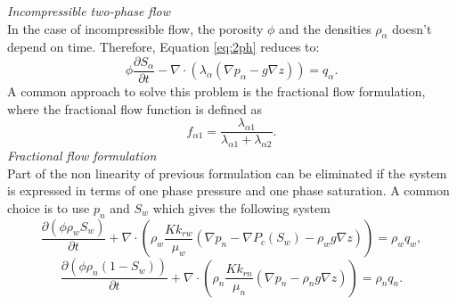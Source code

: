 \documentclass[12pt]{article}
\begin{document}
% 

\emph{Incompressible two-phase flow}\\

In the case of incompressible flow, the porosity $\phi$ and the densities $\rho_{\alpha}$ doesn't depend on time. Therefore, Equation \eqref{eq:2ph} reduces to: 
\begin{equation}\label{eq:2ph}
 \phi \frac{\partial S_{\alpha}}{\partial t}-\nabla \cdot (  \lambda_{\alpha}(\nabla p_{\alpha}-g \nabla z))= q_{\alpha}.
\end{equation}
A common approach to solve this problem is the fractional flow formulation, where the fractional flow function is defined as $$f_{\alpha1}=\frac{\lambda_{\alpha1}}{\lambda_{\alpha1}+\lambda_{\alpha2}}.$$
\emph{Fractional flow formulation}\\
Part of the non linearity of previous formulation can be eliminated if the system is expressed in terms of one phase pressure and one phase saturation. A common choice is to use $p_n$ and $S_w$ which gives the following system
\begin{equation}
 \frac{\partial(\phi \rho_{w}{S}_{w})}{\partial t}+\nabla \cdot ( \rho_{w} \frac{{K}k_{rw}}{\mu_w}(\nabla p_n-\nabla P_c(S_w)-\rho_w g \nabla z))=\rho_{w} q_{w},
\end{equation}
\begin{equation}
 \frac{\partial(\phi \rho_{n}(1-{S}_{w}))}{\partial t}+\nabla \cdot ( \rho_{n} \frac{{K}k_{rn}}{\mu_n}(\nabla p_n-\rho_n g \nabla z))=\rho_{n} q_{n}.
\end{equation}
\end{document}
